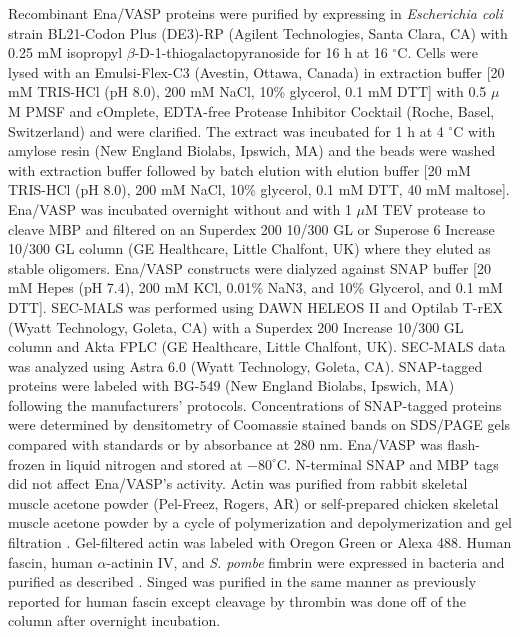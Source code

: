 Recombinant Ena/VASP proteins were purified by expressing in \textit{Escherichia coli} strain BL21-Codon Plus (DE3)-RP (Agilent Technologies, Santa Clara, CA) with 0.25 mM isopropyl $\beta$-D-1-thiogalactopyranoside for 16 h at 16 $^{\circ}$C. Cells were lysed with an Emulsi-Flex-C3 (Avestin, Ottawa, Canada) in extraction buffer [20 mM TRIS-HCl (pH 8.0), 200 mM NaCl, 10\% glycerol, 0.1 mM DTT] with 0.5 $\mu$M PMSF and cOmplete, EDTA-free Protease Inhibitor Cocktail (Roche, Basel, Switzerland) and were clarified. The extract was incubated for 1 h at 4 $^{\circ}$C with amylose resin (New England Biolabs, Ipswich, MA) and the beads were washed with extraction buffer followed by batch elution with elution buffer [20 mM TRIS-HCl (pH 8.0), 200 mM NaCl, 10\% glycerol, 0.1 mM DTT, 40 mM maltose]. Ena/VASP was incubated overnight without and with 1 $\mu$M TEV protease to cleave MBP and filtered on an Superdex 200 10/300 GL or Superose 6 Increase 10/300 GL column (GE Healthcare, Little Chalfont, UK) where they eluted as stable oligomers. Ena/VASP constructs were dialyzed against SNAP buffer [20 mM Hepes (pH 7.4), 200 mM KCl, 0.01\% NaN3, and 10\% Glycerol, and 0.1 mM DTT]. SEC-MALS was performed using DAWN HELEOS II and Optilab T-rEX (Wyatt Technology, Goleta, CA) with a Superdex 200 Increase 10/300 GL column and Akta FPLC (GE Healthcare, Little Chalfont, UK). SEC-MALS data was analyzed using Astra 6.0 (Wyatt Technology, Goleta, CA). SNAP-tagged proteins were labeled with BG-549 (New England Biolabs, Ipswich, MA) following the manufacturers' protocols. Concentrations of SNAP-tagged proteins were determined by densitometry of Coomassie stained bands on SDS/PAGE gels compared with standards or by absorbance at 280 nm. Ena/VASP was flash-frozen in liquid nitrogen and stored at $-80^{\circ}$C. N-terminal SNAP and MBP tags did not affect Ena/VASP's activity. Actin was purified from rabbit skeletal muscle acetone powder (Pel-Freez, Rogers, AR) or self-prepared chicken skeletal muscle acetone powder by a cycle of polymerization and depolymerization and gel filtration \citep{spudich_regulation_1971}. Gel-filtered actin was labeled with Oregon Green \citep{kuhn_real-time_2005} or Alexa 488. Human fascin, human $\alpha$-actinin IV, and \textit{S. pombe} fimbrin were expressed in bacteria and purified as described \citep{vignjevic_formation_2003,skau_fimbrin_2010,li_f-actin_2016}. Singed was purified in the same manner as previously reported for human fascin \citep{vignjevic_formation_2003} except cleavage by thrombin was done off of the column after overnight incubation. 

